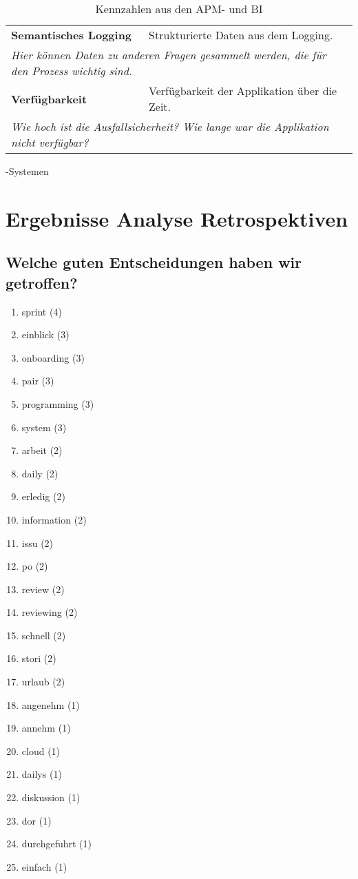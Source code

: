 \begin{table}[H]
\begin{tabular}{p{5cm}p{9.5cm}}
    \textbf{Semantisches Logging} & Strukturierte Daten aus dem Logging. \\
    \multicolumn{2}{p{14.5cm}}{\textit{Hier können Daten zu anderen Fragen gesammelt werden, die für den Prozess wichtig sind.}} \\ \bottomrule
    \textbf{Verfügbarkeit} & Verfügbarkeit der Applikation über die Zeit. \\
    \multicolumn{2}{p{14.5cm}}{\textit{Wie hoch ist die Ausfallsicherheit? \newline Wie lange war die Applikation nicht verfügbar?}} \\ \bottomrule
    \end{tabular}
    \caption{Kennzahlen aus den \ac{APM}- und \ac{BI}}-Systemen\label{metrics-table-apm}
  \end{table}

\newpage
\section{Ergebnisse Analyse Retrospektiven}\label{appendix:retros}

\subsection*{Welche guten Entscheidungen haben wir getroffen?}
\begin{enumerate}
    \item sprint (4)
    \item einblick (3)
    \item onboarding (3)
    \item pair (3)
    \item programming (3)
    \item system (3)
    \item arbeit (2)
    \item daily (2)
    \item erledig (2)
    \item information (2)
    \item issu (2)
    \item po (2)
    \item review (2)
    \item reviewing (2)
    \item schnell (2)
    \item stori (2)
    \item urlaub (2)
    \item angenehm (1)
    \item annehm (1)
    \item cloud (1)
    \item dailys (1)
    \item diskussion (1)
    \item dor (1)
    \item durchgefuhrt (1)
    \item einfach (1)
\end{enumerate}

